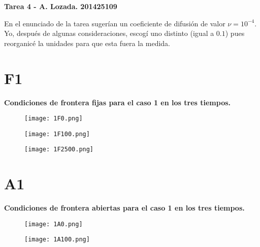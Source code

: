 \documentclass[12pt,letterpaper]{article}
\begin{document}
\begin{center}
{\textbf{Tarea 4 - A. Lozada. 201425109}}\\
\vspace{0.2cm}
\end{center}


En el enunciado de la tarea sugerían un coeficiente de difusión de valor $\nu= 10^{-4}$. Yo, después de algunas consideraciones, escogí uno distinto (igual a $0.1$) pues reorganicé la unidades para que esta fuera la medida. 

\section{F1}
\vspace{0.2cm}

\begin{center}
{\textbf{Condiciones de frontera fijas para el caso 1 en los tres tiempos.}}\\
\vspace{0.2cm}
\end{center}


\begin{figure}[H]
\texttt{[image: 1F0.png]}
\centering
\end{figure}

\begin{figure}[H]
\texttt{[image: 1F100.png]}
\centering
\end{figure}

\begin{figure}[H]
\texttt{[image: 1F2500.png]}
\centering
\end{figure}


\section{A1}
\vspace{0.2cm}

\begin{center}
{\textbf{Condiciones de frontera abiertas para el caso 1 en los tres tiempos.}}\\
\vspace{0.2cm}
\end{center}

\begin{figure}[H]
\texttt{[image: 1A0.png]}
\centering
\end{figure}

\begin{figure}[H]
\texttt{[image: 1A100.png]}
\centering
\end{figure}
\end{document}
